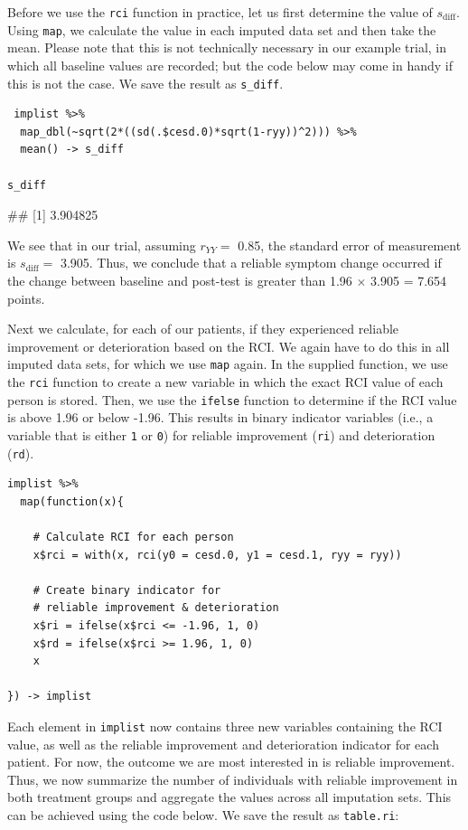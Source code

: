 Before we use the \texttt{rci} function in practice, let us first determine the value of $s_{\text{diff}}$. Using \texttt{map}, we calculate the value in each imputed data set and then take the mean. Please note that this is not technically necessary in our example trial, in which all baseline values are recorded; but the code below may come in handy if this is not the case. We save the result as \texttt{s\_diff}.

\begin{lstlisting}
 implist %>% 
  map_dbl(~sqrt(2*((sd(.$cesd.0)*sqrt(1-ryy))^2))) %>% 
  mean() -> s_diff
  
s_diff
\end{lstlisting}

\begin{example}
## [1] 3.904825
\end{example}

We see that in our trial, assuming $r_{YY}=$ 0.85, the standard error of measurement is $s_{\text{diff}}=$ 3.905. Thus, we conclude that a reliable symptom change occurred if the change between baseline and post-test is greater than 1.96 $\times$ 3.905 = 7.654 points.

Next we calculate, for each of our patients, if they experienced reliable improvement or deterioration based on the RCI. We again have to do this in all imputed data sets, for which we use \texttt{map} again. In the supplied function, we use the \texttt{rci} function to create a new variable in which the exact RCI value of each person is stored. Then, we use the \texttt{ifelse} function to determine if the RCI value is above 1.96 or below -1.96. This results in binary indicator variables (i.e., a variable that is either \texttt{1} or \texttt{0}) for reliable improvement (\texttt{ri}) and deterioration (\texttt{rd}).

\begin{lstlisting}
implist %>%
  map(function(x){
    
    # Calculate RCI for each person
    x$rci = with(x, rci(y0 = cesd.0, y1 = cesd.1, ryy = ryy))
    
    # Create binary indicator for 
    # reliable improvement & deterioration
    x$ri = ifelse(x$rci <= -1.96, 1, 0)
    x$rd = ifelse(x$rci >= 1.96, 1, 0)
    x
    
}) -> implist
\end{lstlisting}

Each element in \texttt{implist} now contains three new variables containing the RCI value, as well as the reliable improvement and deterioration indicator for each patient. For now, the outcome we are most interested in is reliable improvement. Thus, we now summarize the number of individuals with reliable improvement in both treatment groups and aggregate the values across all imputation sets. This can be achieved using the code below. We save the result as \texttt{table.ri}:


